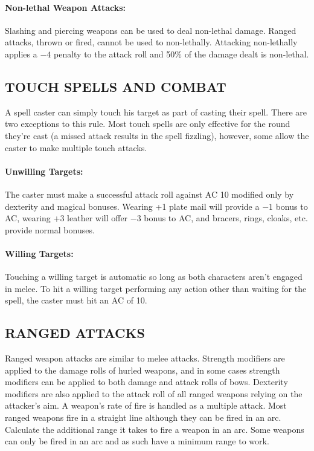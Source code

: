 \begin{multicols}{2}
\paragraph{Non-lethal Weapon Attacks:} Slashing and piercing weapons can be used to deal non-lethal damage.  Ranged attacks, thrown or fired, cannot be used to non-lethally.  Attacking non-lethally applies a $-4$ penalty to the attack roll and 50\% of the damage dealt is non-lethal.

\subsection{TOUCH SPELLS AND COMBAT}

A spell caster can simply touch his target as part of casting their spell.  There are two exceptions to this rule.  Most touch spells are only effective for the round they're cast (a missed attack results in the spell fizzling), however, some allow the caster to make multiple touch attacks.

\paragraph{Unwilling Targets:} The caster must make a successful attack roll against AC 10 modified only by dexterity and magical bonuses.  Wearing +1 plate mail will provide a $-1$ bonus to AC, wearing +3 leather will offer $-3$ bonus to AC, and bracers, rings, cloaks, etc. provide normal bonuses.

\paragraph{Willing Targets:} Touching a willing target is automatic so long as both characters aren't engaged in melee.  To hit a willing target performing any action other than waiting for the spell, the caster must hit an AC of 10.  

\subsection{RANGED ATTACKS}

Ranged weapon attacks are similar to melee attacks.  Strength modifiers are applied to the damage rolls of hurled weapons, and in some cases strength modifiers can be applied to both damage and attack rolls of bows.  Dexterity modifiers are also applied to the attack roll of all ranged weapons relying on the attacker's aim.  A weapon's rate of fire is handled as a multiple attack.  Most ranged weapons fire in a straight line although they can be fired in an arc.  Calculate the additional range it takes to fire a weapon in an arc.  Some weapons can only be fired in an arc and as such have a minimum range to work.  
 

\end{multicols}
